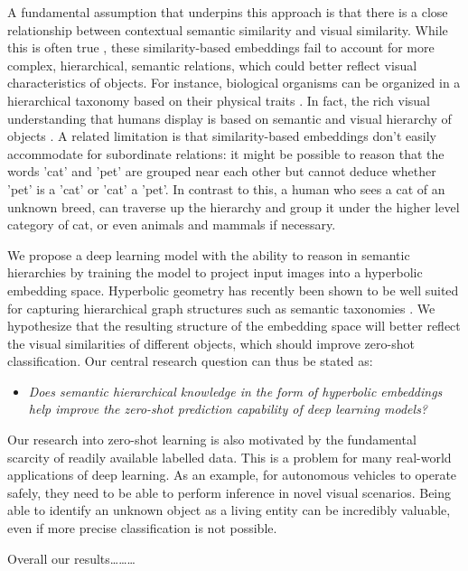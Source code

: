 \documentclass[12pt]{report}
\begin{document}
A fundamental assumption that underpins this approach is that there is a close relationship between contextual semantic similarity and visual similarity. While this is often true \cite{Deselaers2011}, these similarity-based embeddings fail to account for more complex, hierarchical, semantic relations, which could better reflect visual characteristics of objects. For instance, biological organisms can be organized in a hierarchical taxonomy based on their physical traits \cite{Ohl2015}. In fact, the rich visual understanding that humans display is based on semantic and visual hierarchy of objects \cite{Joliceur1984}. A related limitation is that similarity-based embeddings don't easily accommodate for subordinate relations: it might be possible to reason that the words 'cat' and 'pet' are grouped near each other but cannot deduce whether 'pet' is a 'cat' or 'cat' a 'pet'. In contrast to this, a human who sees a cat of an unknown breed, can traverse up the hierarchy and group it under the higher level category of cat, or even animals and mammals if necessary. 

We propose a deep learning model with the ability to reason in semantic hierarchies by training the model to project input images into a hyperbolic embedding space. Hyperbolic geometry has recently been shown to be well suited for capturing hierarchical graph structures such as semantic taxonomies \cite{Nickel2017, Chamberlain2017}. We hypothesize that the resulting structure of the embedding space will better reflect the visual similarities of different objects, which should improve zero-shot classification. Our central research question can thus be stated as: 
\begin{itemize}
  \item \textit{Does semantic hierarchical knowledge in the form of hyperbolic embeddings help improve the zero-shot prediction capability of deep learning models?}
\end{itemize}

Our research into zero-shot learning is also motivated by the fundamental scarcity of readily available labelled data. This is a problem for many real-world applications of deep learning. As an example, for autonomous vehicles to operate safely, they need to be able to perform inference in novel visual scenarios. Being able to identify an unknown object as a living entity can be incredibly valuable, even if more precise classification is not possible.

Overall our results\dots\dots\dots
\end{document}
